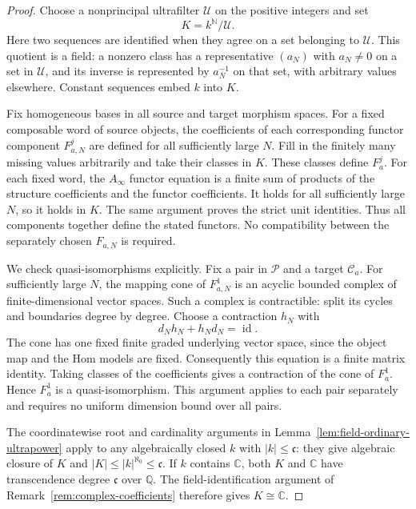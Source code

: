 \documentclass[11pt]{article}
\numberwithin{equation}{section}
\theoremstyle{definition}
\theoremstyle{remark}
\begin{document}
\begin{proof}
Choose a nonprincipal ultrafilter $\mathcal U$ on the positive integers
and set
\[
 K=k^{\mathbb N}/\mathcal U.
\]
Here two sequences are identified when they agree on a set belonging to
$\mathcal U$.  This quotient is a field: a nonzero class has a
representative $(a_N)$ with $a_N\ne0$ on a set in $\mathcal U$, and its
inverse is represented by $a_N^{-1}$ on that set, with arbitrary values
elsewhere.  Constant sequences embed $k$ into $K$.

Fix homogeneous bases in all source and target morphism spaces.  For a
fixed composable word of source objects, the coefficients of each
corresponding functor component $F_{a,N}^j$ are defined for all sufficiently
large $N$.  Fill in the finitely many missing values arbitrarily and take
their classes in $K$.  These classes define $F_a^j$.  For each fixed word,
the $A_\infty$ functor equation is a finite sum of products of the
structure coefficients and the functor coefficients.  It holds for all
sufficiently large $N$, so it holds in $K$.  The same argument proves the
strict unit identities.  Thus all components together define the stated
functors.  No compatibility between the separately chosen $F_{a,N}$ is
required.

We check quasi-isomorphisms explicitly.  Fix a pair in $\mathcal P$ and a
target $\mathcal C_a$.  For sufficiently large $N$, the mapping cone of
$F_{a,N}^1$ is an acyclic bounded complex of finite-dimensional vector
spaces.  Such a complex is contractible: split its cycles and boundaries
degree by degree.  Choose a contraction $h_N$ with
\[
 d_Nh_N+h_Nd_N=\operatorname{id}.
\]
The cone has one fixed finite graded underlying vector space, since the
object map and the Hom models are fixed.  Consequently this equation is
a finite matrix identity.  Taking classes of the coefficients gives a
contraction of the cone of $F_a^1$.  Hence $F_a^1$ is a quasi-isomorphism.
This argument applies to each pair separately and requires no uniform
dimension bound over all pairs.

The coordinatewise root and cardinality arguments in
Lemma~\ref{lem:field-ordinary-ultrapower} apply to any algebraically
closed $k$ with $|k|\le\mathfrak c$: they give algebraic closure of
$K$ and $|K|\le |k|^{\aleph_0}\le\mathfrak c$.
If $k$ contains $\mathbb C$, both $K$ and $\mathbb C$ have transcendence degree
$\mathfrak c$ over $\mathbb Q$.  The field-identification argument of
Remark~\ref{rem:complex-coefficients} therefore gives $K\cong\mathbb C$.
\end{proof}
\end{document}
